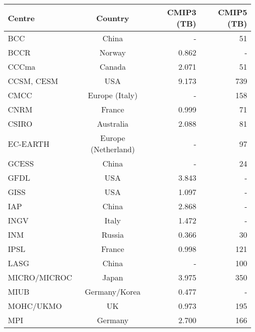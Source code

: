 \begin{table}[htb]
	\small
	\centering
	\begin{tabular}{  l | c | r | r  }
		Centre & Country             &  CMIP3 (TB)& CMIP5 (TB) \\ \hline\hline
		BCC              & China               &  -                 & 51                \\
		BCCR             & Norway              & 0.862               & - \\
		CCCma            & Canada              & 2.071              & 51               \\
		CCSM, CESM       & USA                 & 9.173              & 739               \\
		CMCC             & Europe (Italy)      & -                  & 158            \\
		CNRM             & France              & 0.999               & 71              \\
		CSIRO            & Australia           & 2.088              & 81               \\
		EC-EARTH         & Europe (Netherland) &    -               & 97               \\
		GCESS            & China               &  -                 & 24               \\
		GFDL             & USA                 & 3.843              & - \\
		GISS             & USA                 & 1.097              & - \\
		IAP              & China               & 2.868              & - \\
		INGV             & Italy               & 1.472              & - \\
		INM              & Russia              & 0.366               & 30              \\
		IPSL             & France              & 0.998               & 121             \\
		LASG             & China               &  -                 & 100              \\
		MICRO/MICROC     & Japan               & 3.975              & 350              \\
		MIUB             & Germany/Korea       & 0.477               & - \\
		MOHC/UKMO            & UK                  &   0.973                & 195               \\
		MPI              & Germany             & 2.700              & 166              \\

\end{tabular}
\end{table}
